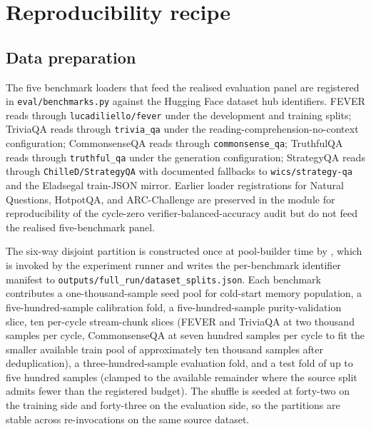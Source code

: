 
\chapter{Reproducibility recipe}
\label{app:reproducibility}

\section{Data preparation}
\label{app:repro-data}

The five benchmark loaders that feed the realised evaluation panel are registered in \verb|eval/benchmarks.py| against the Hugging Face dataset hub identifiers. FEVER reads through \verb|lucadiliello/fever| under the development and training splits; TriviaQA reads through \verb|trivia_qa| under the reading-comprehension-no-context configuration; CommonsenseQA reads through \verb|commonsense_qa|; TruthfulQA reads through \verb|truthful_qa| under the generation configuration; StrategyQA reads through \verb|ChilleD/StrategyQA| with documented fallbacks to \verb|wics/strategy-qa| and the Eladsegal train-JSON mirror. Earlier loader registrations for Natural Questions, HotpotQA, and ARC-Challenge are preserved in the module for reproducibility of the cycle-zero verifier-balanced-accuracy audit but do not feed the realised five-benchmark panel.

The six-way disjoint partition is constructed once at pool-builder time by , which is invoked by the experiment runner and writes the per-benchmark identifier manifest to \verb|outputs/full_run/dataset_splits.json|. Each benchmark contributes a one-thousand-sample seed pool for cold-start memory population, a five-hundred-sample calibration fold, a five-hundred-sample purity-validation slice, ten per-cycle stream-chunk slices (FEVER and TriviaQA at two thousand samples per cycle, CommonsenseQA at seven hundred samples per cycle to fit the smaller available train pool of approximately ten thousand samples after deduplication), a three-hundred-sample evaluation fold, and a test fold of up to five hundred samples (clamped to the available remainder where the source split admits fewer than the registered budget). The shuffle is seeded at forty-two on the training side and forty-three on the evaluation side, so the partitions are stable across re-invocations on the same source dataset.

